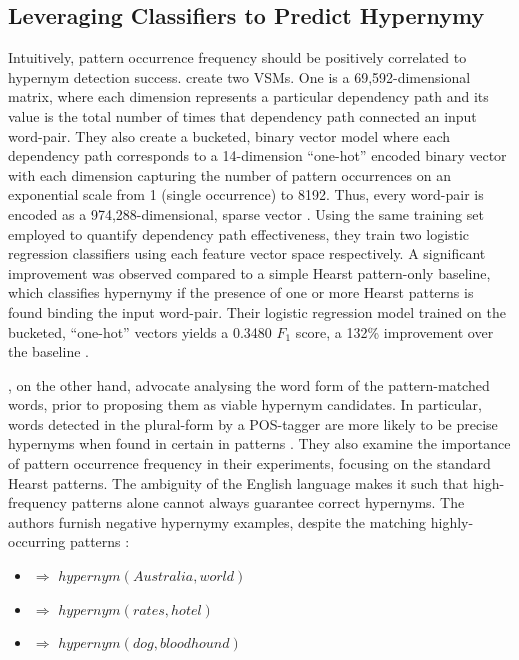 \subsection{Leveraging Classifiers to Predict Hypernymy}
Intuitively, pattern occurrence frequency should be positively correlated to hypernym detection success.  \citeauthor{Snow2004} create two \ac{VSM}s.  One is a 69,592-dimensional matrix, where each dimension represents a particular dependency path and its value is the total number of times that dependency path connected an input word-pair.  They also create a bucketed, binary vector model where each dependency path corresponds to a 14-dimension ``one-hot'' encoded binary vector with each dimension capturing the number of pattern occurrences on an exponential scale from 1 (single occurrence) to 8192.  Thus, every word-pair is encoded as a 974,288-dimensional, sparse vector \citep{Snow2004}.  Using the same training set employed to quantify dependency path effectiveness, they train two logistic regression classifiers using each feature vector space respectively.  A significant improvement was observed compared to a simple Hearst pattern-only baseline, which classifies hypernymy if the presence of one or more Hearst patterns is found binding the input word-pair.  Their logistic regression model trained on the bucketed, “one-hot” vectors yields a 0.3480 $F_1$ score, a 132\% improvement over the baseline \citep{Snow2004}. 

\citet{ritter2009anyway}, on the other hand, advocate analysing the word form of the pattern-matched words, prior to proposing them as viable hypernym candidates.  In particular, words detected in the plural-form by a POS-tagger are more likely to be precise hypernyms when found in certain in patterns \citep{ritter2009anyway}.  They also examine the importance of pattern occurrence frequency in their experiments, focusing on the standard Hearst patterns.  The ambiguity of the English language makes it such that high-frequency patterns alone cannot always guarantee correct hypernyms.  The authors furnish negative hypernymy examples, despite the matching highly-occurring patterns \citep{ritter2009anyway}:
\begin{itemize}
    \item {} $\Rightarrow$ $hypernym(Australia, world)$
    \item {} $\Rightarrow$ $hypernym(rates, hotel)$
    \item {} $\Rightarrow$ $hypernym(dog, bloodhound)$
\end{itemize}

